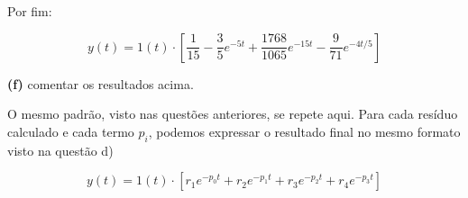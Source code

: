 \documentclass{article}
\begin{document}
Por fim:

\[ y(t) = 1(t) \cdot \left[ \frac{1}{15} - \frac{3}{5}e^{-5t} + \frac{1768}{1065}e^{-15t} - \frac{9}{71}e^{-4t/5} \right] \]

\vspace{\baselineskip}

\textbf{(f)} comentar os resultados acima.

\vspace{\baselineskip}

O mesmo padrão, visto nas questões anteriores, se repete aqui. 
Para cada resíduo calculado e cada termo $ p_i $, podemos expressar o resultado final 
no mesmo formato visto na questão d)

\[ y(t) = 1(t) \cdot \left[ r_1 e^{-p_0 t} + r_2 e^{-p_1 t} + r_3 e^{-p_2 t} + r_4 e^{-p_3 t} \right]\]
\end{document}
